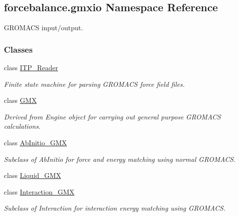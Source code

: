 \hypertarget{namespaceforcebalance_1_1gmxio}{\subsection{forcebalance.\-gmxio Namespace Reference}
\label{namespaceforcebalance_1_1gmxio}
}


G\-R\-O\-M\-A\-C\-S input/output.  


\subsubsection*{Classes}
\begin{DoxyCompactItemize}
\item 
class \hyperlink{classforcebalance_1_1gmxio_1_1ITP__Reader}{I\-T\-P\-\_\-\-Reader}
\begin{DoxyCompactList}\small\item\em Finite state machine for parsing G\-R\-O\-M\-A\-C\-S force field files. \end{DoxyCompactList}\item 
class \hyperlink{classforcebalance_1_1gmxio_1_1GMX}{G\-M\-X}
\begin{DoxyCompactList}\small\item\em Derived from Engine object for carrying out general purpose G\-R\-O\-M\-A\-C\-S calculations. \end{DoxyCompactList}\item 
class \hyperlink{classforcebalance_1_1gmxio_1_1AbInitio__GMX}{Ab\-Initio\-\_\-\-G\-M\-X}
\begin{DoxyCompactList}\small\item\em Subclass of Ab\-Initio for force and energy matching using normal G\-R\-O\-M\-A\-C\-S. \end{DoxyCompactList}\item 
class \hyperlink{classforcebalance_1_1gmxio_1_1Liquid__GMX}{Liquid\-\_\-\-G\-M\-X}
\item 
class \hyperlink{classforcebalance_1_1gmxio_1_1Interaction__GMX}{Interaction\-\_\-\-G\-M\-X}
\begin{DoxyCompactList}\small\item\em Subclass of Interaction for interaction energy matching using G\-R\-O\-M\-A\-C\-S. \end{DoxyCompactList}\end{DoxyCompactItemize}
